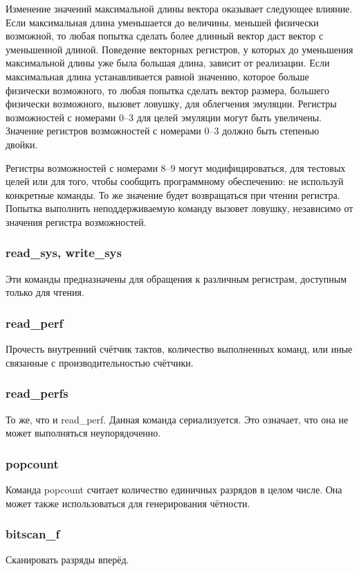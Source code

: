 \documentclass[forwardcom.tex]{subfiles}
\begin{document}
Изменение значений максимальной длины вектора оказывает следующее влияние. Если максимальная длина уменьшается до величины, меньшей физически возможной, то любая попытка сделать более длинный вектор даст вектор с уменьшенной длиной. Поведение векторных регистров, у которых до уменьшения максимальной длины уже была большая длина, зависит от реализации. Если максимальная длина устанавливается равной значению, которое больше физически возможного, то любая попытка сделать вектор размера, большего физически возможного, вызовет ловушку, для облегчения эмуляции. Регистры возможностей с номерами 0--3 для целей эмуляции могут быть увеличены. Значение регистров возможностей с номерами 0--3 должно быть степенью двойки.

Регистры возможностей с номерами 8--9 могут модифицироваться, для тестовых целей или для того, чтобы сообщить программному обеспечению: \glqq не используй конкретные команды\grqq. То же значение будет возвращаться при чтении регистра. Попытка выполнить неподдерживаемую команду вызовет ловушку, независимо от значения регистра возможностей.

\subsubsection{read\_sys, write\_sys}
Эти команды предназначены для обращения к различным регистрам, доступным только для чтения.

\subsubsection{read\_perf}
Прочесть внутренний счётчик тактов, количество выполненных команд, или иные связанные с производительностью счётчики.

\subsubsection{read\_perfs}
То же, что и read\_perf. Данная команда сериализуется. Это означает, что она не может выполняться неупорядоченно.

\subsubsection{popcount}
Команда popcount считает количество единичных разрядов в целом числе. Она может также использоваться для генерирования чётности.

\subsubsection{bitscan\_f}
Сканировать разряды вперёд.
\end{document}

